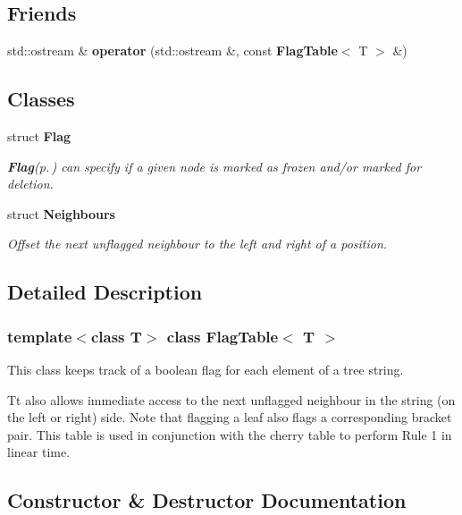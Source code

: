 \subsection*{Friends}
\begin{CompactItemize}
\item 
std::ostream \& {\bf operator} (std::ostream \&, const {\bf Flag\-Table}$<$ T $>$ \&)
\end{CompactItemize}
\subsection*{Classes}
\begin{CompactItemize}
\item 
struct {\bf Flag}
\begin{CompactList}\small\item\em {\bf Flag}{\rm (p.\,\pageref{structFlagTable_1_1Flag})} can specify if a given node is marked as frozen and/or marked for deletion. \item\end{CompactList}\item 
struct {\bf Neighbours}
\begin{CompactList}\small\item\em Offset the next unflagged neighbour to the left and right of a position. \item\end{CompactList}\end{CompactItemize}


\subsection{Detailed Description}
\subsubsection*{template$<$class T$>$ class Flag\-Table$<$ T $>$}

This class keeps track of a boolean flag for each element of a tree string. 

Tt also allows immediate access to the next unflagged neighbour in the string (on the left or right) side. Note that flagging a leaf also flags a corresponding bracket pair. This table is used in conjunction with the cherry table to perform Rule 1 in linear time. 



\subsection{Constructor \& Destructor Documentation}
